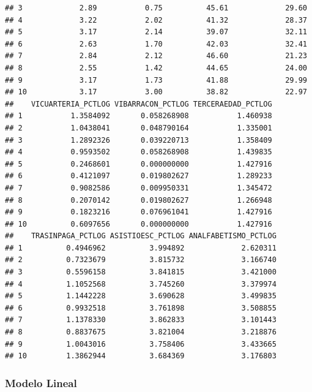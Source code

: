 \documentclass[11pt,]{article}
\newenvironment{Shaded}{\begin{snugshade}}{\end{snugshade}}
\newcommand{\KeywordTok}[1]{\textcolor[rgb]{0.13,0.29,0.53}{\textbf{#1}}}
\newcommand{\StringTok}[1]{\textcolor[rgb]{0.31,0.60,0.02}{#1}}
\newcommand{\OperatorTok}[1]{\textcolor[rgb]{0.81,0.36,0.00}{\textbf{#1}}}
\newcommand{\NormalTok}[1]{#1}
\begin{document}
\begin{verbatim}
## 3             2.89           0.75          45.61             29.60
## 4             3.22           2.02          41.32             28.37
## 5             3.17           2.14          39.07             32.11
## 6             2.63           1.70          42.03             32.41
## 7             2.84           2.12          46.60             21.23
## 8             2.55           1.42          44.65             24.00
## 9             3.17           1.73          41.88             29.99
## 10            3.17           3.00          38.82             22.97
##    VICUARTERIA_PCTLOG VIBARRACON_PCTLOG TERCERAEDAD_PCTLOG
## 1           1.3584092       0.058268908           1.460938
## 2           1.0438041       0.048790164           1.335001
## 3           1.2892326       0.039220713           1.358409
## 4           0.9593502       0.058268908           1.439835
## 5           0.2468601       0.000000000           1.427916
## 6           0.4121097       0.019802627           1.289233
## 7           0.9082586       0.009950331           1.345472
## 8           0.2070142       0.019802627           1.266948
## 9           0.1823216       0.076961041           1.427916
## 10          0.6097656       0.000000000           1.427916
##    TRASINPAGA_PCTLOG ASISTIOESC_PCTLOG ANALFABETISMO_PCTLOG
## 1          0.4946962          3.994892             2.620311
## 2          0.7323679          3.815732             3.166740
## 3          0.5596158          3.841815             3.421000
## 4          1.1052568          3.745260             3.379974
## 5          1.1442228          3.690628             3.499835
## 6          0.9932518          3.761898             3.508855
## 7          1.1378330          3.862833             3.101443
## 8          0.8837675          3.821004             3.218876
## 9          1.0043016          3.758406             3.433665
## 10         1.3862944          3.684369             3.176803
\end{verbatim}

\subsubsection{Modelo Lineal}\label{modelo-lineal}

\begin{Shaded}
\end{Shaded}
\end{document}
